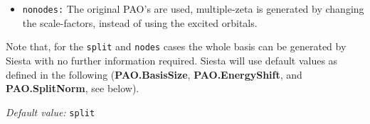 \documentclass[11pt]{article}
\begin{document}
\begin{description}
\begin{itemize}
\item {\tt nonodes:} 
The original PAO's are used, multiple-zeta is generated
by changing the scale-factors, instead of using the excited orbitals. 

\end{itemize}

\noindent
Note that, for the {\tt split} and {\tt nodes} cases
the whole basis can be generated by {\sc Siesta} with no further information
required. {\sc Siesta} will use default values as defined in the following 
({\bf PAO.BasisSize},
{\bf PAO.EnergyShift}, and {\bf PAO.SplitNorm}, see below).

{\it Default value:} {\tt split}

\end{description}
\end{document}
